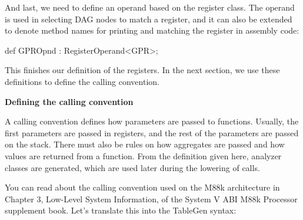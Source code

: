 And last, we need to define an operand based on the register class. The operand is used in selecting DAG nodes to match a register, and it can also be extended to denote method names for printing and matching the register in assembly code:\par

\begin{tcolorbox}[colback=white,colframe=black]
def GPROpnd : RegisterOperand<GPR>;
\end{tcolorbox}

This finishes our definition of the registers. In the next section, we use these definitions to define the calling convention.\par

\hspace*{\fill} \par %
\textbf{Defining the calling convention}

A calling convention defines how parameters are passed to functions. Usually, the first parameters are passed in registers, and the rest of the parameters are passed on the stack. There must also be rules on how aggregates are passed and how values are returned from a function. From the definition given here, analyzer classes are generated, which are used later during the lowering of calls.\par

You can read about the calling convention used on the M88k architecture in Chapter 3, Low-Level System Information, of the System V ABI M88k Processor supplement book. Let's translate this into the TableGen syntax:\par

